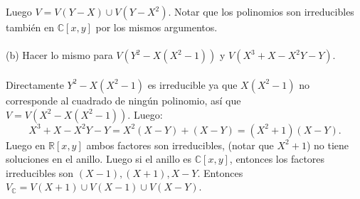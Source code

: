 \documentclass{article}
\newcommand{\R}{\mathbb{R}}
\newcommand{\C}{\mathbb{C}}
\begin{document}
\\
\\
Luego $V=V(Y-X)\cup V(Y-X^2)$. Notar que los polinomios son irreducibles también en $\C[x,y]$ por los mismos argumentos.
\\
\\
(b) Hacer lo mismo para $V(Y^2-X(X^2-1))$ y $V(X^3+X-X^2Y-Y)$.
\\
\\
Directamente $Y^2-X(X^2-1)$ es irreducible ya que $X(X^2-1)$ no corresponde al cuadrado de ningún polinomio, así que $V=V(X^2-X(X^2-1))$. Luego:
\begin{equation*}
    X^3+X-X^2Y-Y=X^2(X-Y)+(X-Y)=(X^2+1)(X-Y).
\end{equation*}
Luego en $\R[x,y]$ ambos factores son irreducibles, (notar que $X^2+1$) no tiene soluciones en el anillo. Luego si el anillo es $\C[x,y]$, entonces los factores irreducibles son $(X-1),(X+1),X-Y$. Entonces $V_{\C}=V(X+1)\cup V(X-1) \cup V(X-Y)$.
\end{document}
